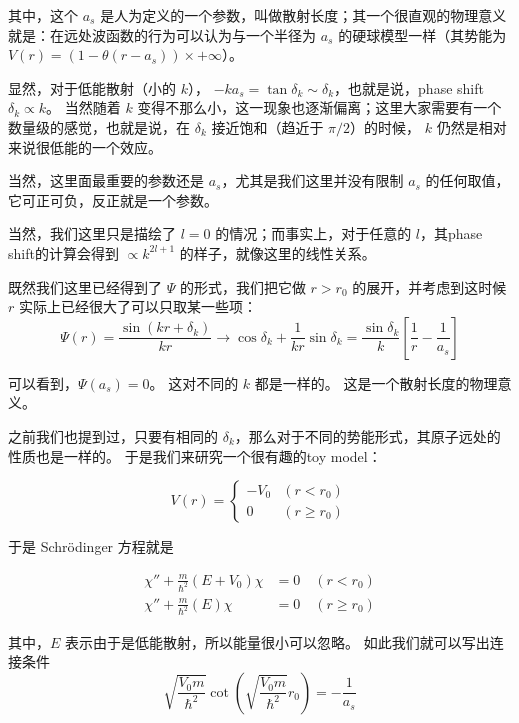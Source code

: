 其中，这个 $a_s$ 是人为定义的一个参数，叫做散射长度；其一个很直观的物理意义就是：在远处波函数的行为可以认为与一个半径为 $a_s$ 的硬球模型一样（其势能为 $V(r) = (1-\theta(r-a_s)) \times +\infty$）。

显然，对于低能散射（小的 $k$）， $-ka_s = \tan\delta_k \sim \delta_k$，也就是说，phase shift $\delta_k \propto k$。 当然随着 $k$ 变得不那么小，这一现象也逐渐偏离；这里大家需要有一个数量级的感觉，也就是说，在 $\delta_k$ 接近饱和（趋近于 $\pi/2$）的时候， $k$ 仍然是相对来说很低能的一个效应。

当然，这里面最重要的参数还是 $a_s$，尤其是我们这里并没有限制 $a_s$ 的任何取值，它可正可负，反正就是一个参数。

当然，我们这里只是描绘了 $l = 0$ 的情况；而事实上，对于任意的 $l$，其phase shift的计算会得到 $\propto k^{2l+1}$ 的样子，就像这里的线性关系。

既然我们这里已经得到了 $\Psi$ 的形式，我们把它做 $r>r_0$ 的展开，并考虑到这时候 $r$ 实际上已经很大了可以只取某一些项：
\begin{equation}
\Psi(r) = \frac{\sin(kr+\delta_k)}{kr} \to \cos\delta_k +\frac{1}{kr}\sin\delta_k = \frac{\sin\delta_k}{k}\left[\frac{1}{r}-\frac{1}{a_s}\right]
\end{equation}

可以看到，$\Psi(a_s)=0$。 这对不同的 $k$ 都是一样的。 这是一个散射长度的物理意义。

之前我们也提到过，只要有相同的 $\delta_k$，那么对于不同的势能形式，其原子远处的性质也是一样的。 于是我们来研究一个很有趣的toy model：

\begin{equation}
V(r)=\begin{cases}
-V_0 & (r<r_0)\\
0 & (r\geqslant r_0)
\end{cases}
\end{equation}

于是 Schrödinger 方程就是

\begin{align}
\chi'' + \frac{m}{\hbar^2}(E+V_0)\chi &= 0\quad (r < r_0)\\
\chi'' + \frac{m}{\hbar^2}(E)\chi &= 0\quad (r \geqslant r_0)
\end{align}

其中，$E$ 表示由于是低能散射，所以能量很小可以忽略。 如此我们就可以写出连接条件
\begin{equation}
\sqrt{\frac{V_0 m}{\hbar^2}}\cot\left(\sqrt{\frac{V_0 m}{\hbar^2}}r_0\right) = -\frac{1}{a_s}
\end{equation}

